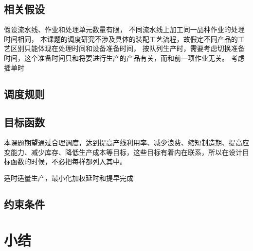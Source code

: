 \subsection{相关假设}

假设流水线、作业和处理单元数量有限，
不同流水线上加工同一品种作业的处理时间相同，
本课题的调度研究不涉及具体的装配工艺流程，故假定不同产品的工艺区别只能体现在处理时间和设备准备时间，
按队列生产时，需要考虑切换准备时间，这个准备时间只和将要进行生产的产品有关，而和前一项作业无关。
考虑插单时


\subsection{调度规则}

\subsection{目标函数}
本课题期望通过合理调度，达到提高产线利用率、减少浪费、缩短制造期、提高应变能力、减少库存、降低生产成本等目标，这些目标有着内在联系，所以在设计目标函数的时候，不必把每样都列入其中。

适时适量生产，最小化加权延时和提早完成
\subsection{约束条件}


\section{小结}
